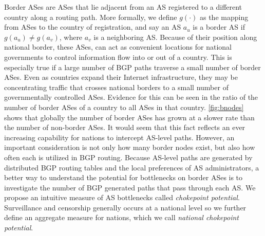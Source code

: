 Border ASes are ASes that lie adjacent from an AS registered to a different
country along a routing path. More formally, we define $g(\cdot)$ as the
mapping from ASes to the country of registration, and say an AS $a_u$ is a border
AS if $g(a_u) \neq g(a_v)$, where $a_v$ is a neighboring AS.  Because of their
position along national border, these ASes, can act as convenient locations for
national governments to control information flow into or out of a country. This
is especially true if a large number of BGP paths traverse a small number of
border ASes. Even as countries expand their Internet infrastructure, they may
be concentrating traffic that crosses national borders to a small number of
governmentally controlled ASes.  Evidence for this can be seen in the ratio of
the number of border ASes of a country to all ASes in that country.
\figurename \ref{fig:bnodes} shows that globally the number of border ASes has
grown at a slower rate than the number of non-border ASes.
It would seem that this fact reflects an ever increasing capability for nations
to intercept AS-level paths.  However, an important consideration is not only
how many border nodes exist, but also how often each is utilized in BGP
routing. Because AS-level paths are generated by distributed BGP routing tables
and the local preferences of AS administrators, a better way to understand the
potential for bottlenecks on border ASes is to investigate the number of BGP
generated paths that pass through each AS. We propose an intuitive measure of
AS bottlenecks called \emph{chokepoint potential}. Surveillance and censorship
generally occurs at a national level so we further define an aggregate measure
for nations, which we call \emph{national chokepoint potential}.


